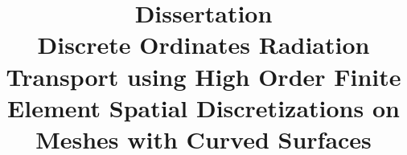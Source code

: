 \documentclass[12pt]{article}
\begin{document}
{\singlespace
\title{Dissertation\\Discrete Ordinates Radiation Transport using High Order Finite Element Spatial Discretizations on Meshes with Curved Surfaces}}
\date{\DefenseDate}
\author{\ThesisAuthor}
\maketitle

\pagebreak
\thispagestyle{empty}


\pagebreak
\thispagestyle{empty}


\pagebreak
\thispagestyle{empty}


\pagebreak
\thispagestyle{empty}


\pagebreak
\thispagestyle{empty}


\pagebreak
\tableofcontents
\thispagestyle{empty}

\pagebreak
\listoffigures
\thispagestyle{empty}

\pagebreak
\listoftables
\thispagestyle{empty}

\pagebreak
{}
\end{document}

